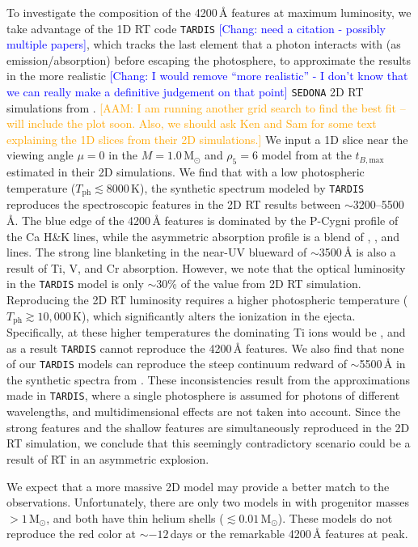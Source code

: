 \documentclass[twocolumn]{aastex631}
\newcommand{\adam}[1]{\textcolor{orange}{[AAM: #1]}}
\newcommand{\chang}[1]{\textcolor{blue}{[Chang: #1]}}
\begin{document}
\begin{CJK*}{UTF8}{gbsn}
To investigate the composition of the 4200\,\r{A} features at maximum luminosity, we take advantage of the 1D RT code \texttt{TARDIS} \chang{need a citation - possibly multiple papers}, which tracks the last element that a photon interacts with (as emission/absorption) before escaping the photosphere, to approximate the results in the more realistic \chang{I would remove ``more realistic'' - I don't know that we can really make a definitive judgement on that point} \texttt{SEDONA} 2D RT simulations from \citet{Shen_2D_2021}. \adam{I am running another grid search to find the best fit -- will include the plot soon. Also, we should ask Ken and Sam for some text explaining the 1D slices from their 2D simulations.} We input a 1D slice near the viewing angle $\mu=0$ in the $M=1.0\,\mathrm{M_\odot}$ and $\rho_5=6$ model from \citet{Shen_2D_2021} at the $t_{B,\mathrm{max}}$ estimated in their 2D simulations. We find that with a low photospheric temperature ($T_\mathrm{ph}\lesssim8000$\,K), the synthetic spectrum modeled by \texttt{TARDIS} reproduces the spectroscopic features in the 2D RT results between $\sim$3200--5500\,\r{A}. The blue edge of the 4200\,\r{A} features is dominated by the P-Cygni profile of the Ca H\&K lines, while the asymmetric absorption profile is a blend of , , and  lines. The strong line blanketing in the near-UV blueward of $\sim$3500\,\r{A} is also a result of Ti, V, and Cr absorption. However, we note that the optical luminosity in the \texttt{TARDIS} model is only $\sim$30\% of the value from 2D RT simulation. Reproducing the 2D RT luminosity requires a higher photospheric temperature ($T_\mathrm{ph}\gtrsim10,000$\,K), which significantly alters the ionization in the ejecta. Specifically, at these higher temperatures the dominating Ti ions would be , and as a result \texttt{TARDIS} cannot reproduce the 4200\,\r{A} features. We also find that none of our \texttt{TARDIS} models can reproduce the steep continuum redward of $\sim$5500\,\r{A} in the synthetic spectra from \citet{Shen_2D_2021}. These inconsistencies result from the approximations made in \texttt{TARDIS}, where a single photosphere is assumed for photons of different wavelengths, and multidimensional effects are not taken into account. Since the strong  features and the shallow  features are simultaneously reproduced in the 2D RT simulation, we conclude that this seemingly contradictory scenario could be a result of RT in an asymmetric explosion.

We expect that a more massive 2D model may provide a better match to the observations. Unfortunately, there are only two models in \citet{Shen_2D_2021} with progenitor masses $>1\,\mathrm{M_\odot}$, and both have thin helium shells ($\lesssim$$0.01\,\mathrm{M_\odot}$). These models do not reproduce the red color at $\sim$$-12$\,days or the remarkable 4200\,\r{A} features at peak.


\end{CJK*}
\end{document}

